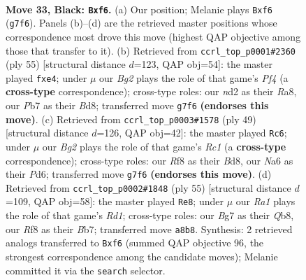\documentclass[11pt]{article}
\begin{document}
\clearpage

\begin{figure}[p]\centering
\begin{subfigure}{0.46\textwidth}\centering
\resizebox{\linewidth}{!}{%
\newchessgame
\chessboard[
  setfen={r1b2r2/pp3pbk/n4Pp1/q2p2Bp/B5PP/1P6/R1PNQP2/1N2R1K1 b - - 0 33},
  showmover=false,
  pgfstyle=straightmove, color=movearrow, markmove={g7-f6}
]}
\caption{}
\end{subfigure}\hfill
\begin{subfigure}{0.46\textwidth}\centering
\resizebox{\linewidth}{!}{%
\newchessgame
\chessboard[
  setfen={r2b2k1/1prnq1p1/4p2p/1P1b1p2/p1NBPP2/P6P/4Q1PK/1BR2R2 b - - 0 28},
  showmover=false,
  pgfstyle=straightmove, color=movearrow, markmove={f5-e4}
]}
\caption{}
\end{subfigure}
\\[4pt]
\begin{subfigure}{0.46\textwidth}\centering
\resizebox{\linewidth}{!}{%
\newchessgame
\chessboard[
  setfen={1krb3r/1p1b1p2/p2ppp2/5P1p/4Pq1P/2N1RB2/PPPQ2P1/K2R4 b - - 20 25},
  showmover=false,
  pgfstyle=straightmove, color=movearrow, markmove={c8-c6}
]}
\caption{}
\end{subfigure}\hfill
\begin{subfigure}{0.46\textwidth}\centering
\resizebox{\linewidth}{!}{%
\newchessgame
\chessboard[
  setfen={1q1r2k1/1b3ppp/pr4n1/2bp4/P2N4/3BQP2/1PP1N1PP/3R1R1K b - - 3 28},
  showmover=false,
  pgfstyle=straightmove, color=movearrow, markmove={d8-e8}
]}
\caption{}
\end{subfigure}
\caption{\textbf{Move 33, Black: \texttt{Bxf6}.} (a) Our position; Melanie plays \texttt{Bxf6} (\texttt{g7f6}). Panels (b)--(d) are the retrieved master positions whose correspondence most drove this move (highest QAP objective among those that transfer to it). (b) Retrieved from \texttt{ccrl\_top\_p0001\#2360} (ply 55) [structural distance $d$=123, QAP obj=54]: the master played \texttt{fxe4}; under $\mu$ our \emph{Bg2} plays the role of that game's \emph{Pf4} (a \textbf{cross-type} correspondence); cross-type roles: our \emph{n}d2 as their \emph{R}a8, our \emph{P}b7 as their \emph{B}d8; transferred move \texttt{g7f6} \textbf{(endorses this move)}. (c) Retrieved from \texttt{ccrl\_top\_p0003\#1578} (ply 49) [structural distance $d$=126, QAP obj=42]: the master played \texttt{Rc6}; under $\mu$ our \emph{Bg2} plays the role of that game's \emph{Rc1} (a \textbf{cross-type} correspondence); cross-type roles: our \emph{R}f8 as their \emph{B}d8, our \emph{N}a6 as their \emph{P}d6; transferred move \texttt{g7f6} \textbf{(endorses this move)}. (d) Retrieved from \texttt{ccrl\_top\_p0002\#1848} (ply 55) [structural distance $d$=109, QAP obj=58]: the master played \texttt{Re8}; under $\mu$ our \emph{Ra1} plays the role of that game's \emph{Rd1}; cross-type roles: our \emph{B}g7 as their \emph{Q}b8, our \emph{R}f8 as their \emph{B}b7; transferred move \texttt{a8b8}. Synthesis: 2 retrieved analogs transferred to \texttt{Bxf6} (summed QAP objective 96, the strongest correspondence among the candidate moves); Melanie committed it via the \texttt{search} selector.}
\label{fig:thought-m65}
\end{figure}
\end{document}
